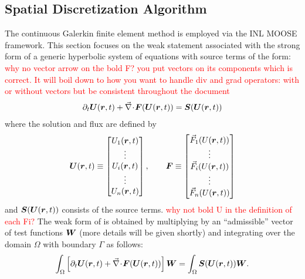 \subsection{Spatial Discretization Algorithm\label{sec:spatial_discretization}}
%
The continuous Galerkin finite element method is employed
via the INL MOOSE framework.  This section focuses on
the weak statement associated with the strong form of a generic hyperbolic system of equations with source terms of the form:
\textcolor{red}{why no vector arrow on the bold F? you put vectors on its components which is correct. It will boil down to how you want to handle div and grad operators: with or without vectors but be consistent throughout the document}
\begin{align}\label{eqn:va_system_notation}
\partial_t \boldsymbol U(\boldsymbol r, t) + \vec{\nabla}\! \cdot \! \boldsymbol F(\boldsymbol U(\boldsymbol r, t)) = \boldsymbol S(\boldsymbol U(\boldsymbol r, t))
\end{align}
where the solution and flux are defined by
\begin{align}
  \boldsymbol U(\boldsymbol r, t) \equiv
  \begin{bmatrix}
    U_1(\boldsymbol r, t)
    \\
    \vdots
    \\
    U_i(\boldsymbol r, t)
    \\
   \vdots
    \\
   U_n(\boldsymbol r, t)
  \end{bmatrix},
  \qquad
  \boldsymbol F \equiv
  \begin{bmatrix}
    \vec{F}_1(U(\boldsymbol r, t))
    \\
    \vdots
    \\
    \vec{F}_i(U(\boldsymbol r, t))
    \\
    \vdots
    \\
    \vec{F}_n(U(\boldsymbol r, t))
  \end{bmatrix}
\end{align}
and $  \boldsymbol S(\boldsymbol U(\boldsymbol r, t))$ consists of the source
terms. \textcolor{red}{why not bold U in the definition of each Fi?}
%
The weak form of  is obtained by multiplying
by an ``admissible'' vector of test functions 
$\boldsymbol W$ (more details will be given shortly) and
integrating over the domain $\Omega$ with boundary $\Gamma$ as follows:
\begin{align}
  \label{en:va_system_weak}
  \int_{\Omega} \left[ \partial_t \boldsymbol U(\boldsymbol r, t) + \vec{\nabla}\! \cdot \! \boldsymbol F(\boldsymbol U(\boldsymbol r, t))\right]  \boldsymbol W 
  =  \int_{\Omega}  \boldsymbol S(\boldsymbol U(\boldsymbol r, t))  \boldsymbol W.
\end{align}
